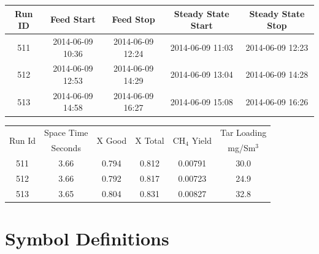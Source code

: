 \documentclass[11pt,twocolumn]{article}
\begin{document}
\begin{center}

\begin{tabular}{ccccc}
	\toprule
	Run ID &            Feed Start &             Feed Stop &            Steady State Start &             Steady State Stop \\
	\midrule
	511    & 2014-06-09 10:36 & 2014-06-09 12:24 & 2014-06-09 11:03 & 2014-06-09 12:23 \\
	512    & 2014-06-09 12:53 & 2014-06-09 14:29 & 2014-06-09 13:04 & 2014-06-09 14:28 \\
	513    & 2014-06-09 14:58 & 2014-06-09 16:27 & 2014-06-09 15:08 & 2014-06-09 16:26 \\
	\bottomrule
\end{tabular}

\vspace{5 mm}

\begin{tabular}{c c c c c c}
	\toprule
	\multirow{2}{*}{Run Id} &  Space Time &  \multirow{2}{*}{X Good} &  \multirow{2}{*}{X Total} &  \multirow{2}{*}{CH$_4$ Yield} &  Tar Loading \\
	{}						& Seconds		& {}						& {}							& {}						& mg/Sm$^3$ \\			
	\midrule
	511    &         3.66 &    0.794 &   0.812 &       0.00791 &          30.0 \\
	512    &         3.66 &    0.792 &   0.817 &       0.00723 &          24.9 \\
	513    &         3.65 &    0.804 &   0.831 &       0.00827 &          32.8 \\
	\bottomrule
\end{tabular}

\end{center}


\section{Symbol Definitions}
\label{ap_symbols}
\end{document}
